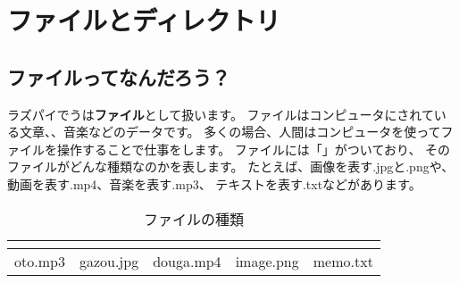 \newpage
\section{ファイルとディレクトリ}
\subsection{ファイルってなんだろう？}
ラズパイでうは{\bf ファイル}として扱います。
ファイルはコンピュータにされている文章、、音楽などのデータです。
多くの場合、人間はコンピュータを使ってファイルを操作することで仕事をします。
ファイルには「」がついており、
そのファイルがどんな種類なのかを表します。
たとえば、画像を表す.jpgと.pngや、動画を表す.mp4、音楽を表す.mp3、
テキストを表す.txtなどがあります。

\begin{table}[H]
  \begin{center}
    \caption[tab:files]{ファイルの種類}
    \begin{tabular}{|c|c|c|c|c|} \hline
    \begin{minipage}{0.12\hsize}
      \begin{center}
        
      \end{center}  
    \end{minipage} & 
    \begin{minipage}{0.12\hsize}
      \begin{center}
        
      \end{center}
    \end{minipage} &
    \begin{minipage}{0.12\hsize}
      \begin{center}
        
      \end{center} 
    \end{minipage} &
    \begin{minipage}{0.12\hsize}
      \begin{center}
        
      \end{center} 
    \end{minipage} &
    \begin{minipage}{0.12\hsize}
      \begin{center}
        
      \end{center} 
    \end{minipage} \\ \hline
    oto.mp3 & gazou.jpg & douga.mp4 & image.png & memo.txt \\ \hline
  \end{tabular}
 \end{center}
\end{table}

